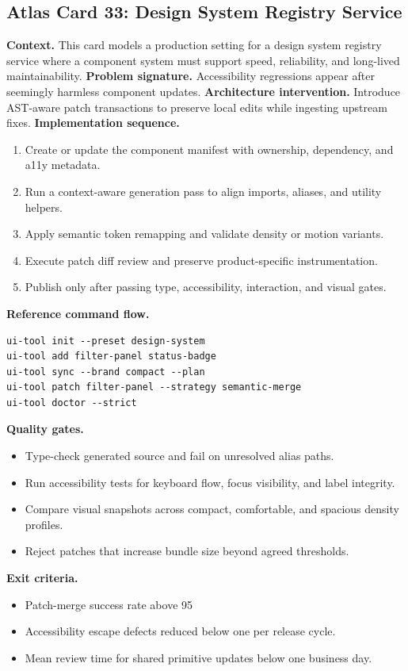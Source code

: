 \subsection*{Atlas Card 33: Design System Registry Service}
\textbf{Context.} This card models a production setting for a design system registry service where a component system must support speed, reliability, and long-lived maintainability.
\textbf{Problem signature.} Accessibility regressions appear after seemingly harmless component updates.
\textbf{Architecture intervention.} Introduce AST-aware patch transactions to preserve local edits while ingesting upstream fixes.
\textbf{Implementation sequence.}
\begin{enumerate}[leftmargin=*, itemsep=0.28em]
  \item Create or update the component manifest with ownership, dependency, and a11y metadata.
  \item Run a context-aware generation pass to align imports, aliases, and utility helpers.
  \item Apply semantic token remapping and validate density or motion variants.
  \item Execute patch diff review and preserve product-specific instrumentation.
  \item Publish only after passing type, accessibility, interaction, and visual gates.
\end{enumerate}
\textbf{Reference command flow.}
\begin{verbatim}
ui-tool init --preset design-system
ui-tool add filter-panel status-badge
ui-tool sync --brand compact --plan
ui-tool patch filter-panel --strategy semantic-merge
ui-tool doctor --strict
\end{verbatim}
\textbf{Quality gates.}
\begin{itemize}[leftmargin=*, itemsep=0.24em]
  \item Type-check generated source and fail on unresolved alias paths.
  \item Run accessibility tests for keyboard flow, focus visibility, and label integrity.
  \item Compare visual snapshots across compact, comfortable, and spacious density profiles.
  \item Reject patches that increase bundle size beyond agreed thresholds.
\end{itemize}
\textbf{Exit criteria.}
\begin{itemize}[leftmargin=*, itemsep=0.24em]
  \item Patch-merge success rate above 95%
  \item Accessibility escape defects reduced below one per release cycle.
  \item Mean review time for shared primitive updates below one business day.
\end{itemize}
\clearpage
